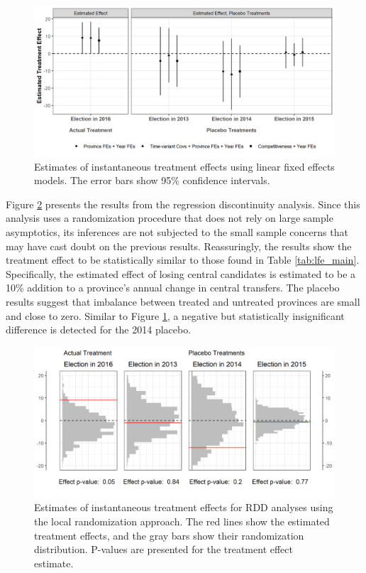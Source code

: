 \documentclass[12pt]{article}
\newcommand{\1}{\mathbbm{1}}
\begin{document}
\begin{figure}[!htbp]
	\centering
	\includegraphics[width=\textwidth]{figure/200422_lfe_placebo.png}
	\captionsetup{singlelinecheck=off}
	\caption[Estimated placebo linear fixed effects treatment effects]{Estimates of instantaneous treatment effects using linear fixed effects models. The error bars show 95\% confidence intervals.}
	\label{fig:lfe_placebo}
\end{figure}

Figure \ref{fig:rdd_placebo} presents the results from the regression discontinuity analysis. Since this analysis uses a randomization procedure that does not rely on large sample asymptotics, its inferences are not subjected to the small sample concerns that may have cast doubt on the previous results. Reassuringly, the results show the treatment effect to be statistically similar to those found in Table \ref{tab:lfe_main}. Specifically, the estimated effect of losing central candidates is estimated to be a 10\% addition to a province's annual change in central transfers. The placebo results suggest that imbalance between treated and untreated provinces are small and close to zero. Similar to Figure \ref{fig:lfe_placebo}, a negative but statistically insignificant difference is detected for the 2014 placebo. 

\begin{figure}[!htbp]
	\centering
	\includegraphics[width=\textwidth]{figure/200422_rdd_results.png}
	\captionsetup{singlelinecheck=off}
	\caption[Estimated RDD treatment effects]{Estimates of instantaneous treatment effects for RDD analyses using the local randomization approach. The red lines show the estimated treatment effects, and the gray bars show their randomization distribution. P-values are presented for the treatment effect estimate.}
	\label{fig:rdd_placebo}
\end{figure}
\end{document}
